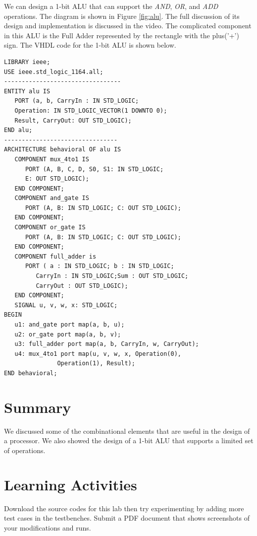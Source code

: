 \documentclass[a4paper, 11pt,oneside]{article}
\begin{document}
We can design a 1-bit ALU that can support the \textit{AND}, \textit{OR}, and \textit{ADD} operations. The diagram is shown in
Figure \ref{fig:alu}. The full discussion of its design and implementation is discussed in the video. The complicated component in this ALU is the Full Adder represented by the rectangle with the plus('+') sign. The VHDL code for the 1-bit ALU is shown below.



\begin{verbatim}
LIBRARY ieee;
USE ieee.std_logic_1164.all;
---------------------------------
ENTITY alu IS
   PORT (a, b, CarryIn : IN STD_LOGIC;
   Operation: IN STD_LOGIC_VECTOR(1 DOWNTO 0);
   Result, CarryOut: OUT STD_LOGIC);
END alu;
--------------------------------
ARCHITECTURE behavioral OF alu IS
   COMPONENT mux_4to1 IS
      PORT (A, B, C, D, S0, S1: IN STD_LOGIC;
      E: OUT STD_LOGIC);
   END COMPONENT;
   COMPONENT and_gate IS
      PORT (A, B: IN STD_LOGIC; C: OUT STD_LOGIC);
   END COMPONENT;
   COMPONENT or_gate IS
      PORT (A, B: IN STD_LOGIC; C: OUT STD_LOGIC);
   END COMPONENT;
   COMPONENT full_adder is
      PORT ( a : IN STD_LOGIC; b : IN STD_LOGIC;
         CarryIn : IN STD_LOGIC;Sum : OUT STD_LOGIC;
         CarryOut : OUT STD_LOGIC);
   END COMPONENT;
   SIGNAL u, v, w, x: STD_LOGIC;
BEGIN
   u1: and_gate port map(a, b, u);
   u2: or_gate port map(a, b, v);
   u3: full_adder port map(a, b, CarryIn, w, CarryOut); 
   u4: mux_4to1 port map(u, v, w, x, Operation(0), 
               Operation(1), Result);
END behavioral;
\end{verbatim}





\section{Summary}
We discussed some of the combinational elements that are useful in the design of a processor. We also showed the design of a 1-bit ALU that supports a limited set of operations.

\section{Learning Activities}
Download the source codes for this lab then try experimenting by adding more test cases in the testbenches. Submit a PDF document that shows screenshots of your modifications and runs.
\end{document}
